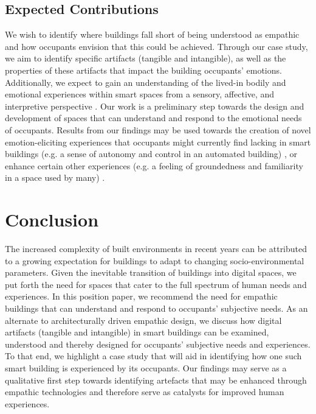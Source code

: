 \documentclass [sigconf, review, anonymous] {acmart}
\begin{document}
\subsection{Expected Contributions}
We wish to identify where buildings fall short of being understood as empathic and how occupants envision that this could be achieved. Through our case study, we aim to identify specific artifacts (tangible and intangible), as well as the properties of these artifacts that impact the building occupants' emotions. Additionally, we expect to gain an understanding of the lived-in bodily and emotional experiences within smart spaces from a sensory, affective, and interpretive perspective \cite{giaccardi2015foundations}. Our work is a preliminary step towards the design and development of spaces that can understand and respond to the emotional needs of occupants. Results from our findings may be used towards the creation of novel emotion-eliciting experiences that occupants might currently find lacking in smart buildings (e.g. a sense of autonomy and control in an automated building) \cite{moreno2014user}, or enhance certain other experiences (e.g. a feeling of groundedness and familiarity in a space used by many) \cite{rehman2022personalisedcomfort}.  

\section{Conclusion}
The increased complexity of built environments in recent years can be attributed to a growing expectation for buildings to adapt to changing socio-environmental parameters. Given the inevitable transition of buildings into digital spaces, we put forth the need for spaces that cater to the full spectrum of human needs and experiences. In this position paper, we recommend the need for empathic buildings that can understand and respond to occupants' subjective needs. As an alternate to architecturally driven empathic design, we discuss how digital artifacts (tangible and intangible) in smart buildings can be examined, understood and thereby designed for occupants' subjective needs and experiences. To that end, we highlight a case study that will aid in identifying how one such smart building is experienced by its occupants. Our findings may serve as a qualitative first step towards identifying artefacts that may be enhanced through empathic technologies and therefore serve as catalysts for improved human experiences. 



\end{document}
